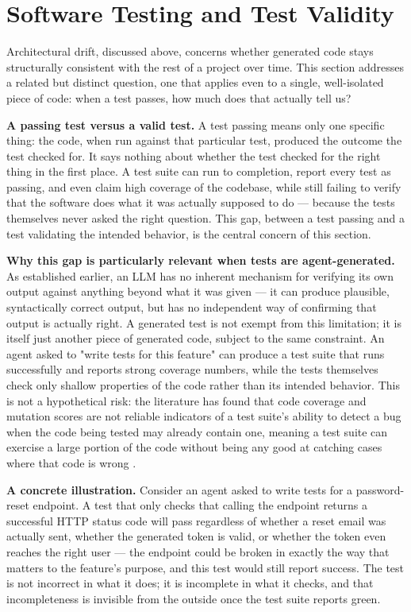 \section{Software Testing and Test Validity}

Architectural drift, discussed above, concerns whether generated code stays structurally consistent with the rest of a project over time. This section addresses a related but distinct question, one that applies even to a single, well-isolated piece of code: when a test passes, how much does that actually tell us?

\textbf{A passing test versus a valid test.} A test passing means only one specific thing: the code, when run against that particular test, produced the outcome the test checked for. It says nothing about whether the test checked for the right thing in the first place. A test suite can run to completion, report every test as passing, and even claim high coverage of the codebase, while still failing to verify that the software does what it was actually supposed to do --- because the tests themselves never asked the right question. This gap, between a test passing and a test validating the intended behavior, is the central concern of this section.

\textbf{Why this gap is particularly relevant when tests are agent-generated.} As established earlier, an LLM has no inherent mechanism for verifying its own output against anything beyond what it was given --- it can produce plausible, syntactically correct output, but has no independent way of confirming that output is actually right. A generated test is not exempt from this limitation; it is itself just another piece of generated code, subject to the same constraint. An agent asked to "write tests for this feature" can produce a test suite that runs successfully and reports strong coverage numbers, while the tests themselves check only shallow properties of the code rather than its intended behavior. This is not a hypothetical risk: the literature has found that code coverage and mutation scores are not reliable indicators of a test suite's ability to detect a bug when the code being tested may already contain one, meaning a test suite can exercise a large portion of the code without being any good at catching cases where that code is wrong \cite{zhao2026coverage}.

\textbf{A concrete illustration.} Consider an agent asked to write tests for a password-reset endpoint. A test that only checks that calling the endpoint returns a successful HTTP status code will pass regardless of whether a reset email was actually sent, whether the generated token is valid, or whether the token even reaches the right user --- the endpoint could be broken in exactly the way that matters to the feature's purpose, and this test would still report success. The test is not incorrect in what it does; it is incomplete in what it checks, and that incompleteness is invisible from the outside once the test suite reports green.

